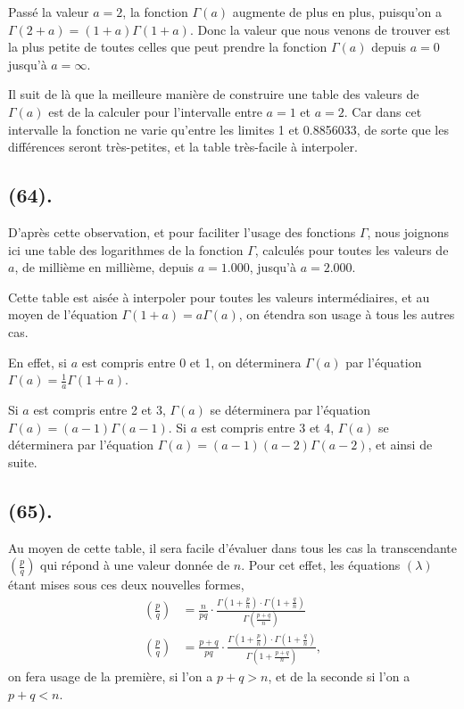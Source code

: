 \documentclass{article}
\begin{document}
Passé la valeur $a=2$, la fonction $\Gamma(a)$ augmente de plus en plus, puisqu'on a $\Gamma(2+a)=(1+a)\Gamma(1+a)$. Donc la valeur que nous venons de trouver est la plus petite de toutes celles que peut prendre la fonction $\Gamma(a)$ depuis $a=0$ jusqu'à $a=\infty$.

Il suit de là que la meilleure manière de construire une table des valeurs de $\Gamma(a)$ est de la calculer pour l'intervalle entre $a=1$ et $a=2$. Car dans cet intervalle la fonction ne varie qu'entre les limites 1 et 0.8856033, de sorte que les différences seront très-petites, et la table très-facile à interpoler.

\subsection*{(64).}

D'après cette observation, et pour faciliter l'usage des fonctions $\Gamma$, nous joignons ici une table des logarithmes de la fonction $\Gamma$, calculés pour toutes les valeurs de $a$, de millième en millième, depuis $a=1.000$, jusqu'à $a=2.000$.

Cette table est aisée à interpoler pour toutes les valeurs intermédiaires, et au moyen de l'équation $\Gamma(1+a)=a\Gamma(a)$, on étendra son usage à tous les autres cas.

En effet, si $a$ est compris entre 0 et 1, on déterminera $\Gamma(a)$ par l'équation $\Gamma(a)=\frac{1}{a}\Gamma(1+a)$.

Si $a$ est compris entre 2 et 3, $\Gamma(a)$ se déterminera par l'équation $\Gamma(a)=(a-1)\Gamma(a-1)$. Si $a$ est compris entre 3 et 4, $\Gamma(a)$ se déterminera par l'équation $\Gamma(a)=(a-1)(a-2)\Gamma(a-2)$, et ainsi de suite.

\subsection*{(65).}

Au moyen de cette table, il sera facile d'évaluer dans tous les cas la transcendante $\left(\frac{p}{q}\right)$ qui répond à une valeur donnée de $n$. Pour cet effet, les équations $(\lambda)$ étant mises sous ces deux nouvelles formes,
\[ \begin{aligned} \left(\frac{p}{q}\right)&=\frac{n}{pq}\cdot\frac{\Gamma\left(1+\frac{p}{n}\right)\cdot\Gamma\left(1+\frac{q}{n}\right)}{\Gamma\left(\frac{p+q}{n}\right)}\\ \left(\frac{p}{q}\right)&=\frac{p+q}{pq}\cdot\frac{\Gamma\left(1+\frac{p}{n}\right)\cdot\Gamma\left(1+\frac{q}{n}\right)}{\Gamma\left(1+\frac{p+q}{n}\right)}, \end{aligned} \]
on fera usage de la première, si l'on a $p+q>n$, et de la seconde si l'on a $p+q<n$.
\end{document}
